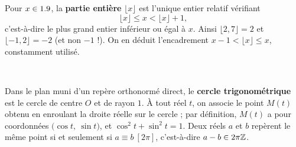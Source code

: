 \noindent
\begin{minipage}[c]{0.56\linewidth}
\begin{definition}
Pour $x\in1.9$, la \textbf{partie entière} $\lfloor x\rfloor$ est l'unique
entier relatif vérifiant
\[
  \lfloor x\rfloor\leq x<\lfloor x\rfloor+1,
\]
c'est-à-dire le plus grand entier inférieur ou égal à $x$. Ainsi
$\lfloor2{,}7\rfloor=2$ et $\lfloor-1{,}2\rfloor=-2$ (et non $-1$ !). On en
déduit l'encadrement $x-1<\lfloor x\rfloor\leq x$, constamment utilisé.
\end{definition}
\end{minipage}\hfill
\begin{minipage}[c]{0.4\linewidth}
\centering
{}\\[0.5mm]
\end{minipage}


\begin{definition}
Dans le plan muni d'un repère orthonormé direct, le \textbf{cercle
trigonométrique} est le cercle de centre $O$ et de rayon $1$. À tout réel
$t$, on associe le point $M(t)$ obtenu en enroulant la droite réelle sur le
cercle ; par définition, $M(t)$ a pour coordonnées
$\bigl(\cos t,\ \sin t\bigr)$, et $\cos^{2}t+\sin^{2}t=1$.
Deux réels $a$ et $b$ repèrent le même point si et seulement si
$a\equiv b\ [2\pi]$, c'est-à-dire $a-b\in2\pi\mathbb{Z}$.
\end{definition}

